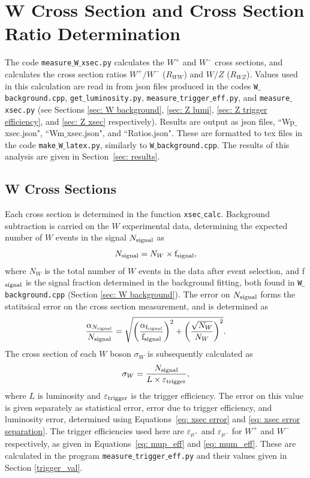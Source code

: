 \documentclass[a4paper]{article}
\begin{document}
\section{W Cross Section and Cross Section Ratio Determination} \label{sec: W xsec}
The code \texttt{measure$\_$W$\_$xsec.py} calculates the $W^+$ and $W^-$ cross sections, and calculates the cross section ratios $W^+/W^-$ ($R_{WW}$) and $W/Z$ ($R_{WZ}$). Values used in this calculation are read in from json files produced in the codes \texttt{W$\_$background.cpp}, \texttt{get$\_$luminosity.py}, \texttt{measure$\_$trigger$\_$eff.py}, and \texttt{measure$\_$xsec.py} (see Sections \ref{sec: W background}, \ref{sec: Z lumi}, \ref{sec: Z trigger efficiency}, and \ref{sec: Z xsec} respectively). Results are output as json files, ``Wp$\_$xsec.json", ``Wm$\_$xsec.json", and ``Ratios.json". These are formatted to tex files in the code \texttt{make$\_$W$\_$latex.py}, similarly to \texttt{W$\_$background.cpp}.
The results of this analysis are given in Section~\ref{sec: results}.

\subsection{W Cross Sections}
Each cross section is determined in the function \texttt{xsec$\_$calc}. Background subtraction is carried on the $W$ experimental data, determining the expected number of $W$ events in the signal $N_{\rm signal}$ as
\begin{equation}
    N_{\rm signal} = N_W \times {\rm f}_{\rm signal},
\end{equation}
where $N_W$ is the total number of $W$ events in the data after event selection, and f$_{\rm signal}$ is the signal fraction determined in the background fitting, both found in \texttt{W$\_$background.cpp} (Section \ref{sec: W background}). The error on $N_{\rm signal}$ forms the statitsical error on the cross section measurement, and is determined as
\begin{equation}
    \frac{\alpha_{N_{\rm signal}}}{N_{\rm signal}} = \sqrt{\left(\frac{\alpha_{{\rm f}_{\rm signal}}}{{\rm f}_{\rm signal}}\right)^2 + \left(\frac{\sqrt{N_W}}{N_W}\right)^2} .
\end{equation}
The cross section of each $W$ boson $\sigma_W$ is subsequently calculated as
\begin{equation}
    \sigma_W = \frac{N_{\rm signal}}{L \times \varepsilon_{\rm trigger}},
    \label{eq: W_xsec}
\end{equation}
where $L$ is luminosity and $\varepsilon_{\rm trigger}$ is the trigger efficiency. The error on this value is given separately as statistical error, error due to trigger efficiency, and luminosity error, determined using Equations~\ref{eq: xsec error} and \ref{eq: xsec error separation}.
The trigger efficiencies used here are $\varepsilon_{\mu^+}$ and $\varepsilon_{\mu^-}$ for $W^+$ and $W^-$ respectively, as given in Equations~\ref{eq: mup_eff} and \ref{eq: mum_eff}. These are calculated in the program \texttt{measure$\_$trigger$\_$eff.py} and their values given in Section \ref{trigger_val}. 
\end{document}
